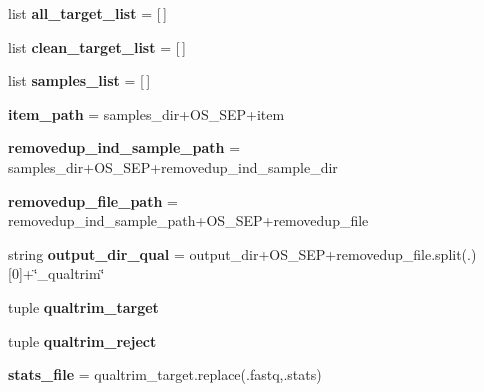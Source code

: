 \begin{DoxyCompactItemize}
\item 
list {\bfseries all\+\_\+target\+\_\+list} = \mbox{[}$\,$\mbox{]}\hypertarget{namespaceNGSXqualtrim_aaf2adb8375b95730c3009a35cd9db63b}{}\label{namespaceNGSXqualtrim_aaf2adb8375b95730c3009a35cd9db63b}

\item 
list {\bfseries clean\+\_\+target\+\_\+list} = \mbox{[}$\,$\mbox{]}\hypertarget{namespaceNGSXqualtrim_a315946690267ade41c71c691839fe858}{}\label{namespaceNGSXqualtrim_a315946690267ade41c71c691839fe858}

\item 
list {\bfseries samples\+\_\+list} = \mbox{[}$\,$\mbox{]}\hypertarget{namespaceNGSXqualtrim_a936e8eeb012b1c475db6d8a452253778}{}\label{namespaceNGSXqualtrim_a936e8eeb012b1c475db6d8a452253778}

\item 
{\bfseries item\+\_\+path} = samples\+\_\+dir+O\+S\+\_\+\+S\+EP+item\hypertarget{namespaceNGSXqualtrim_a389d416ef66ff78b76b66dfaef1b4466}{}\label{namespaceNGSXqualtrim_a389d416ef66ff78b76b66dfaef1b4466}

\item 
{\bfseries removedup\+\_\+ind\+\_\+sample\+\_\+path} = samples\+\_\+dir+O\+S\+\_\+\+S\+EP+removedup\+\_\+ind\+\_\+sample\+\_\+dir\hypertarget{namespaceNGSXqualtrim_a8367d979ea5e25acc70226174f6873cd}{}\label{namespaceNGSXqualtrim_a8367d979ea5e25acc70226174f6873cd}

\item 
{\bfseries removedup\+\_\+file\+\_\+path} = removedup\+\_\+ind\+\_\+sample\+\_\+path+O\+S\+\_\+\+S\+EP+removedup\+\_\+file\hypertarget{namespaceNGSXqualtrim_a0f6d9042305758d8a3dd810fe722d7e7}{}\label{namespaceNGSXqualtrim_a0f6d9042305758d8a3dd810fe722d7e7}

\item 
string {\bfseries output\+\_\+dir\+\_\+qual} = output\+\_\+dir+O\+S\+\_\+\+S\+EP+removedup\+\_\+file.\+split(\textquotesingle{}.\textquotesingle{})\mbox{[}0\mbox{]}+\char`\"{}\+\_\+qualtrim\char`\"{}\hypertarget{namespaceNGSXqualtrim_a01b4950dc78355faad9dcc54191d37e0}{}\label{namespaceNGSXqualtrim_a01b4950dc78355faad9dcc54191d37e0}

\item 
tuple {\bfseries qualtrim\+\_\+target}
\item 
tuple {\bfseries qualtrim\+\_\+reject}
\item 
{\bfseries stats\+\_\+file} = qualtrim\+\_\+target.\+replace(\textquotesingle{}.fastq\textquotesingle{},\textquotesingle{}.stats\textquotesingle{})\hypertarget{namespaceNGSXqualtrim_a35b2144f7e64ac0e2ca88187c3849fd0}{}\label{namespaceNGSXqualtrim_a35b2144f7e64ac0e2ca88187c3849fd0}

\end{DoxyCompactItemize}


